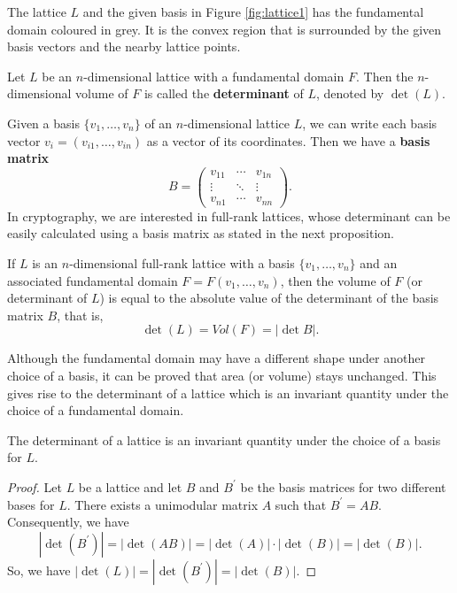 \documentclass[../main.tex]{subfiles}
\begin{document}
The lattice $L$ and the given basis in Figure \ref{fig:lattice1} has the fundamental domain coloured in grey. It is the convex region that is surrounded by the given basis vectors and the nearby lattice points. 

\begin{definition}
\reversemarginpar
{}
Let $L$ be an $n$-dimensional lattice with a fundamental domain $F$. Then the $n$-dimensional volume of $F$ is called the \textbf{determinant}  of $L$, denoted by $\det(L)$. 
\end{definition}

Given a basis $\{v_1, \dots, v_n\}$ of an $n$-dimensional lattice $L$, we can write each basis vector $v_i = (v_{i1}, \dots, v_{in})$ as a vector of its coordinates. Then we have a \textbf{basis matrix} 
\begin{equation}
\label{equation:basis matrix}
B = 
\begin{pmatrix}
v_{11} & \cdots & v_{1n} \\ 
\vdots & \ddots & \vdots \\
v_{n1} & \cdots & v_{nn}
\end{pmatrix}.
\end{equation}
In cryptography, we are interested in full-rank lattices, whose determinant can be easily calculated using a basis matrix as stated in the next proposition. 

\begin{proposition}
If $L$ is an $n$-dimensional full-rank lattice with a basis $\{v_1, \dots, v_n\}$ and an associated fundamental domain $F = F(v_1, \dots, v_n)$, then the volume of $F$ (or determinant of $L$) is equal to the absolute value of the determinant of the basis matrix $B$, that is,
\begin{equation*}
    \det(L)=Vol(F) = |\det B|.
\end{equation*}
\end{proposition}

Although the fundamental domain may have a different shape under another choice of a basis, it can be proved that area (or volume) stays unchanged. This gives rise to the determinant of a lattice which is an invariant quantity under the choice of a fundamental domain. 

\begin{corollary}
\reversemarginpar
{}
The determinant of a lattice is an invariant  quantity under the choice of a basis for $L$.
\end{corollary}
\begin{proof}
Let $L$ be a lattice and let $B$ and $B^\prime$ be the basis matrices for two different bases for $L$. There exists a unimodular matrix $A$ such that $B^{\prime} = AB$. Consequently, we have
\begin{equation*}
|\det(B^{\prime})| = |\det (AB)|=|\det(A)|\cdot |\det(B)|=|\det(B)|.
\end{equation*}
So, we have $|\det(L)| = |\det(B^{\prime})| = |\det(B)|$.
\end{proof}
\end{document}
